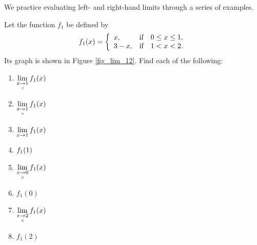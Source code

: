 We practice evaluating left- and right-hand limits through a series of examples.


\begin{example}\label{ex_onesidea}
Let the function $f_1$ be defined by
$$\displaystyle f_1(x) = \left\{\begin{array}{lcl} x, & \mbox{if} & 0\leq x\leq 1, \\ 3-x, & \mbox{if} & 1<x<2.\end{array}\right.$$
Its graph is shown in Figure \ref{fig_lim_12}. Find each of the following: 

\begin{multicols}{4}
	\begin{enumerate}
		\item		$\displaystyle \lim_{x\underset{<}{\rightarrow}1} f_1(x)$
		\item		$\displaystyle \lim_{x\underset{>}{\rightarrow}1} f_1(x)$
		\item		$\displaystyle \lim_{x\to 1} f_1(x)$
		\item		$\displaystyle f_1(1)$
		\item		$\displaystyle \lim_{x\underset{>}{\rightarrow}0} f_1(x)$
		\item		$f_1(0)$
		\item		$\displaystyle \lim_{x\underset{<}{\rightarrow}2} f_1(x)$
		\item		$f_1(2)$
	\end{enumerate}
\end{multicols}




\end{example}
